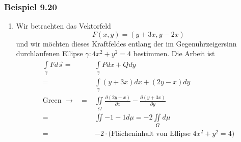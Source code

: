\subsubsection*{Beispiel 9.20}
\begin{enumerate}
\item Wir betrachten das Vektorfeld \[ F\left( x,y\right) = \left( y+3x,y-2x\right) \]
und wir möchten dieses Kraftfeldes entlang der im Gegenuhrzeigersinn durchlaufenen Ellipse $\gamma: 4x^2+y^2=4$ bestimmen. Die Arbeit ist
\begin{align*}
\int\limits_\gamma  {Fd\vec s}  =&\int\limits_\gamma  {Pdx + Qdy} \\
 =&\int\limits_\gamma  {\left( {y + 3x} \right)dx + \left( {2y - x} \right)dy} \\
{\text{Green }} \to {\text{ }} =&\iint\limits_\Omega\frac{{\partial \left( {2y - x} \right)}}{{\partial x}} - \frac{{\partial \left( {y + 3x} \right)}}{{\partial y}}\\
=&\iint -1-1d\mu=-2\iint\limits_\Omega d\mu\\
=&-2\cdot\text{(Flächeninhalt von Ellipse $4x^2+y^2=4$)}\\
\end{align*}

\begin{center}
\end{center}


\end{enumerate}

